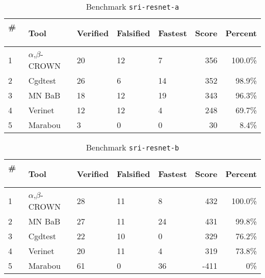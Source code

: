 
\begin{table}[h]
\begin{center}
\caption{Benchmark \texttt{sri-resnet-a}} \label{tab:cat_{cat}}
{\setlength{\tabcolsep}{2pt}
\begin{tabular}[h]{@{}lllllrr@{}}
\toprule
\textbf{\# ~} & \textbf{Tool} & \textbf{Verified} & \textbf{Falsified} & \textbf{Fastest} & \textbf{Score} & \textbf{Percent}\\
\midrule
1 & $\alpha$,$\beta$-CROWN & 20 & 12 & 7 & 356 & 100.0\% \\
2 & Cgdtest & 26 & 6 & 14 & 352 & 98.9\% \\
3 & MN BaB & 18 & 12 & 19 & 343 & 96.3\% \\
4 & Verinet & 12 & 12 & 4 & 248 & 69.7\% \\
5 & Marabou & 3 & 0 & 0 & 30 & 8.4\% \\
\bottomrule
\end{tabular}
}
\end{center}
\end{table}




\begin{table}[h]
\begin{center}
\caption{Benchmark \texttt{sri-resnet-b}} \label{tab:cat_{cat}}
{\setlength{\tabcolsep}{2pt}
\begin{tabular}[h]{@{}lllllrr@{}}
\toprule
\textbf{\# ~} & \textbf{Tool} & \textbf{Verified} & \textbf{Falsified} & \textbf{Fastest} & \textbf{Score} & \textbf{Percent}\\
\midrule
1 & $\alpha$,$\beta$-CROWN & 28 & 11 & 8 & 432 & 100.0\% \\
2 & MN BaB & 27 & 11 & 24 & 431 & 99.8\% \\
3 & Cgdtest & 22 & 10 & 0 & 329 & 76.2\% \\
4 & Verinet & 20 & 11 & 4 & 319 & 73.8\% \\
5 & Marabou & 61 & 0 & 36 & -411 & 0\% \\
\bottomrule
\end{tabular}
}
\end{center}
\end{table}




